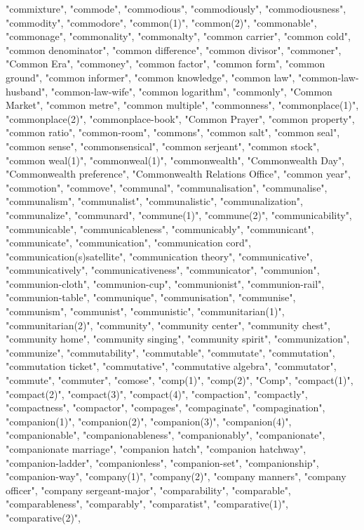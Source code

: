 "commixture",
"commode",
"commodious",
"commodiously",
"commodiousness",
"commodity",
"commodore",
"common(1)",
"common(2)",
"commonable",
"commonage",
"commonality",
"commonalty",
"common carrier",
"common cold",
"common denominator",
"common difference",
"common divisor",
"commoner",
"Common Era",
"commoney",
"common factor",
"common form",
"common ground",
"common informer",
"common knowledge",
"common law",
"common-law-husband",
"common-law-wife",
"common logarithm",
"commonly",
"Common Market",
"common metre",
"common multiple",
"commonness",
"commonplace(1)",
"commonplace(2)",
"commonplace-book",
"Common Prayer",
"common property",
"common ratio",
"common-room",
"commons",
"common salt",
"common seal",
"common sense",
"commonsensical",
"common serjeant",
"common stock",
"common weal(1)",
"commonweal(1)",
"commonwealth",
"Commonwealth Day",
"Commonwealth preference",
"Commonwealth Relations Office",
"common year",
"commotion",
"commove",
"communal",
"communalisation",
"communalise",
"communalism",
"communalist",
"communalistic",
"communalization",
"communalize",
"communard",
"commune(1)",
"commune(2)",
"communicability",
"communicable",
"communicableness",
"communicably",
"communicant",
"communicate",
"communication",
"communication cord",
"communication(s)satellite",
"communication theory",
"communicative",
"communicatively",
"communicativeness",
"communicator",
"communion",
"communion-cloth",
"communion-cup",
"communionist",
"communion-rail",
"communion-table",
"communique",
"communisation",
"communise",
"communism",
"communist",
"communistic",
"communitarian(1)",
"communitarian(2)",
"community",
"community center",
"community chest",
"community home",
"community singing",
"community spirit",
"communization",
"communize",
"commutability",
"commutable",
"commutate",
"commutation",
"commutation ticket",
"commutative",
"commutative algebra",
"commutator",
"commute",
"commuter",
"comose",
"comp(1)",
"comp(2)",
"Comp",
"compact(1)",
"compact(2)",
"compact(3)",
"compact(4)",
"compaction",
"compactly",
"compactness",
"compactor",
"compages",
"compaginate",
"compagination",
"companion(1)",
"companion(2)",
"companion(3)",
"companion(4)",
"companionable",
"companionableness",
"companionably",
"companionate",
"companionate marriage",
"companion hatch",
"companion hatchway",
"companion-ladder",
"companionless",
"companion-set",
"companionship",
"companion-way",
"company(1)",
"company(2)",
"company manners",
"company officer",
"company sergeant-major",
"comparability",
"comparable",
"comparableness",
"comparably",
"comparatist",
"comparative(1)",
"comparative(2)",
